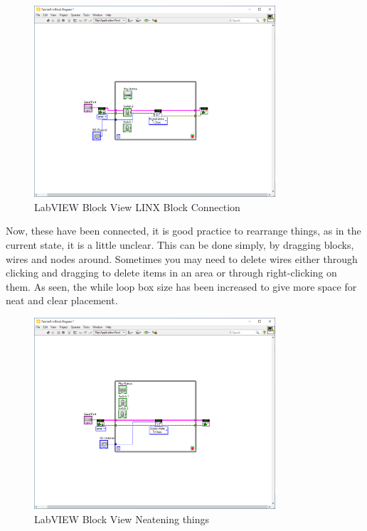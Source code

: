 \documentclass[a4paper,11pt]{report}
\begin{document}
\begin{figure}[H]
\centering
\includegraphics[width=0.8\textwidth]{screenshots/labview22}
\caption{LabVIEW Block View LINX Block Connection}
\end{figure}

Now, these have been connected, it is good practice to rearrange things, as in the current state, it is a little unclear. This can be done simply, by dragging blocks, wires and nodes around. Sometimes you may need to delete wires either through clicking and dragging to delete items in an area or through right-clicking on them. As seen, the while loop box size has been increased to give more space for neat and clear placement.

\begin{figure}[H]
\centering
\includegraphics[width=0.8\textwidth]{screenshots/labview23}
\caption{LabVIEW Block View Neatening things}
\end{figure}
\end{document}
